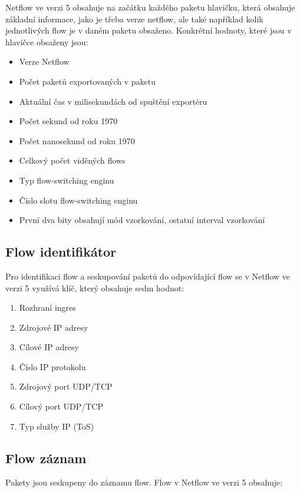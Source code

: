 \documentclass{article}
\begin{document}
Netflow ve verzi 5 obsahuje na začátku každého paketu hlavičku, která obsahuje
základní informace, jako je třeba verze netflow, ale také například kolik
jednotlivých flow je v daném paketu obsaženo. Konkrétní hodnoty, které jsou
v hlavičce obsaženy jsou:
\begin{itemize}
    \item Verze Netflow
    \item Počet paketů exportovaných v paketu
    \item Aktuální čas v milisekundách od spuštění exportéru
    \item Počet sekund od roku 1970
    \item Počet nanosekund od roku 1970
    \item Celkový počet viděných flows
    \item Typ flow-switching enginu
    \item Číslo slotu flow-switching enginu
    \item První dva bity obsahují mód vzorkování, ostatní interval vzorkování
\end{itemize}

\subsection{Flow identifikátor}
\label{sec:flow-key}

Pro identifikaci flow a seskupování paketů do odpovídající flow se v Netflow
ve verzi 5 využívá klíč, který obsahuje sedm hodnot:
\begin{enumerate}
    \item Rozhraní ingres
    \item Zdrojové IP adresy
    \item Cílové IP adresy
    \item Číslo IP protokolu
    \item Zdrojový port UDP/TCP
    \item Cílový port UDP/TCP
    \item Typ služby IP (ToS)
\end{enumerate}

\subsection{Flow záznam}
\label{sec:flow-record}

Pakety jsou seskupeny do záznamu flow. Flow v Netflow ve verzi 5 obsahuje:
\end{document}
